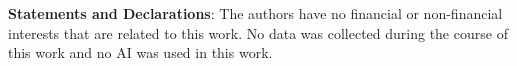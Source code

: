 \documentclass[a4paper,centertags,oneside,12pt]{amsart}
\numberwithin{equation}{section}
\begin{document}
{\bf Statements and Declarations}: The authors have no financial or non-financial
interests that are related to this work. No data was collected
during the course of this work and  no AI was used in this work.
\end{document}
